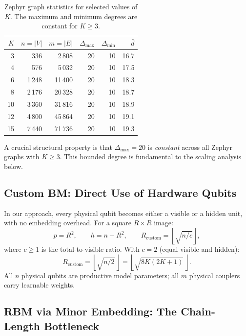 \documentclass[11pt,a4paper]{article}
\begin{document}
\begin{table}[h]
\centering
\caption{Zephyr graph statistics for selected values of $K$.  The maximum and minimum degrees are constant for $K\geq 3$.}
\label{tab:zephyrstats}
\begin{tabular}{@{}rrrrrr@{}}
\toprule
$K$ & $n = |V|$ & $m = |E|$ & $\Delta_{\max}$ & $\Delta_{\min}$ & $\bar{d}$ \\
\midrule
3  &   336 &  2\,808 & 20 & 10 & 16.7 \\
4  &   576 &  5\,032 & 20 & 10 & 17.5 \\
6  & 1\,248 & 11\,400 & 20 & 10 & 18.3 \\
8  & 2\,176 & 20\,328 & 20 & 10 & 18.7 \\
10 & 3\,360 & 31\,816 & 20 & 10 & 18.9 \\
12 & 4\,800 & 45\,864 & 20 & 10 & 19.1 \\
15 & 7\,440 & 71\,736 & 20 & 10 & 19.3 \\
\bottomrule
\end{tabular}
\end{table}

A crucial structural property is that $\Delta_{\max} = 20$ is \emph{constant} across all Zephyr graphs with $K\geq 3$.  This bounded degree is fundamental to the scaling analysis below.

\subsection{Custom BM: Direct Use of Hardware Qubits}\label{sec:custscale}

In our approach, every physical qubit becomes either a visible or a hidden unit, with no embedding overhead.  For a square $R\times R$ image:
\begin{equation}\label{eq:custR}
  p = R^2, \qquad h = n - R^2, \qquad R_{\mathrm{custom}} = \left\lfloor \sqrt{n/c} \right\rfloor,
\end{equation}
where $c \geq 1$ is the total-to-visible ratio.  With $c=2$ (equal visible and hidden):
\[
  R_{\mathrm{custom}} = \left\lfloor \sqrt{n/2}\,\right\rfloor = \left\lfloor \sqrt{8K(2K+1)}\,\right\rfloor.
\]
All $n$ physical qubits are productive model parameters; all $m$ physical couplers carry learnable weights.

\subsection{RBM via Minor Embedding: The Chain-Length Bottleneck}\label{sec:rbmscale}
\end{document}
